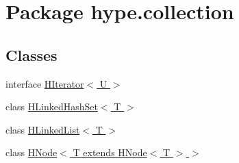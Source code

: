 \hypertarget{namespacehype_1_1collection}{\section{Package hype.\-collection}
\label{namespacehype_1_1collection}
}
\subsection*{Classes}
\begin{DoxyCompactItemize}
\item 
interface \hyperlink{interfacehype_1_1collection_1_1_h_iterator_3_01_u_01_4}{H\-Iterator$<$ U $>$}
\item 
class \hyperlink{classhype_1_1collection_1_1_h_linked_hash_set_3_01_t_01_4}{H\-Linked\-Hash\-Set$<$ T $>$}
\item 
class \hyperlink{classhype_1_1collection_1_1_h_linked_list_3_01_t_01_4}{H\-Linked\-List$<$ T $>$}
\item 
class \hyperlink{classhype_1_1collection_1_1_h_node_3_01_t_01extends_01_h_node_3_01_t_01_4_01_4}{H\-Node$<$ T extends H\-Node$<$ T $>$ $>$}
\end{DoxyCompactItemize}
